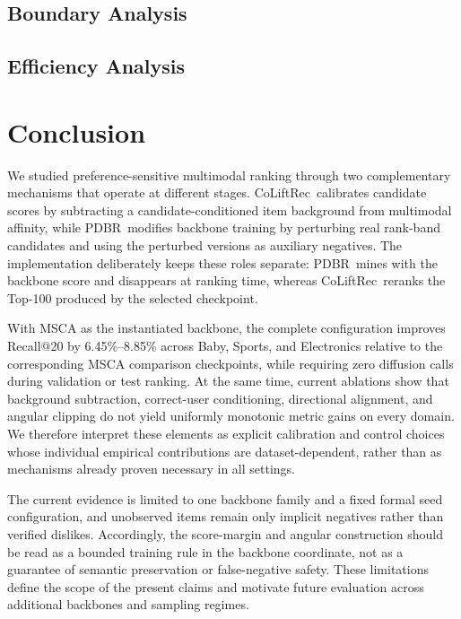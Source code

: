 \documentclass[sigconf,anonymous,review]{acmart}
\newcommand{\methodname}{CoLiftRec}
\newcommand{\pdbr}{PDBR}
\begin{document}
\subsection{Boundary Analysis}

\subsection{Efficiency Analysis}

\section{Conclusion}
\label{sec:conclusion}

We studied preference-sensitive multimodal ranking through two complementary mechanisms that operate at different stages.
\methodname\ calibrates candidate scores by subtracting a candidate-conditioned item background from multimodal affinity, while \pdbr\ modifies backbone training by perturbing real rank-band candidates and using the perturbed versions as auxiliary negatives.
The implementation deliberately keeps these roles separate: \pdbr\ mines with the backbone score and disappears at ranking time, whereas \methodname\ reranks the Top-100 produced by the selected checkpoint.

With MSCA as the instantiated backbone, the complete configuration improves Recall@20 by 6.45\%--8.85\% across Baby, Sports, and Electronics relative to the corresponding MSCA comparison checkpoints, while requiring zero diffusion calls during validation or test ranking.
At the same time, current ablations show that background subtraction, correct-user conditioning, directional alignment, and angular clipping do not yield uniformly monotonic metric gains on every domain.
We therefore interpret these elements as explicit calibration and control choices whose individual empirical contributions are dataset-dependent, rather than as mechanisms already proven necessary in all settings.

The current evidence is limited to one backbone family and a fixed formal seed configuration, and unobserved items remain only implicit negatives rather than verified dislikes.
Accordingly, the score-margin and angular construction should be read as a bounded training rule in the backbone coordinate, not as a guarantee of semantic preservation or false-negative safety.
These limitations define the scope of the present claims and motivate future evaluation across additional backbones and sampling regimes.



\end{document}
